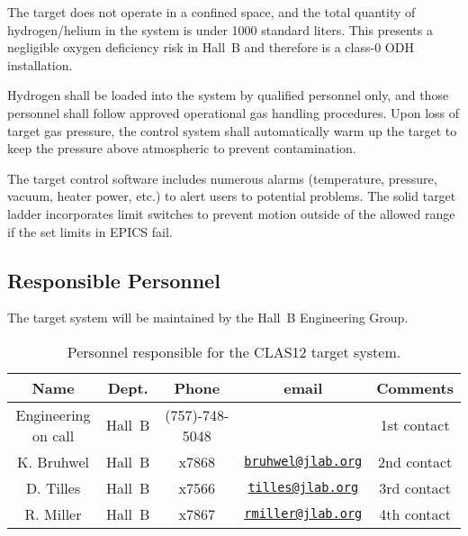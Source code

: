 The target does not operate in a confined space, and the total quantity of hydrogen/helium in 
the system is under 1000 standard liters. This presents a negligible oxygen deficiency risk in 
Hall~B and therefore is a class-0 ODH installation.

Hydrogen shall be loaded into the system by qualified personnel only, and those personnel shall 
follow approved operational gas handling procedures.   Upon loss of target gas pressure, the 
control system shall automatically warm up the target to keep the pressure above atmospheric to 
prevent contamination. 

The target control software includes numerous alarms (temperature, pressure, vacuum, heater 
power, etc.) to alert users to potential problems. The solid target ladder incorporates limit 
switches to prevent motion outside of the allowed range if the set limits in EPICS fail. 

\subsection{Responsible Personnel}

The target system will be maintained by the Hall~B Engineering Group.  

\begin{table}[!htb]
\centering
\begin{tabular}{|c|c|c|c|c|}
\hline
 Name&Dept.&Phone&email&Comments \\ \hline
Engineering on call & Hall~B&(757)-748-5048&& 1st contact  \\ \hline
K. Bruhwel& Hall~B&x7868&\href{mailto:bruhwel@jlab.org}{\nolinkurl{bruhwel@jlab.org}}&2nd contact \\ \hline
D. Tilles & Hall~B&x7566&\href{mailto:tilles@jlab.org}{\nolinkurl{tilles@jlab.org}}  &3rd contact \\ \hline
R. Miller &Hall~B&x7867&\href{mailto:rmiller@jlab.org}{\nolinkurl{rmiller@jlab.org}} &4th contact \\ \hline
\end{tabular}
\caption{Personnel responsible for the CLAS12 target system.} 
\label{tb:target}
\end{table}
